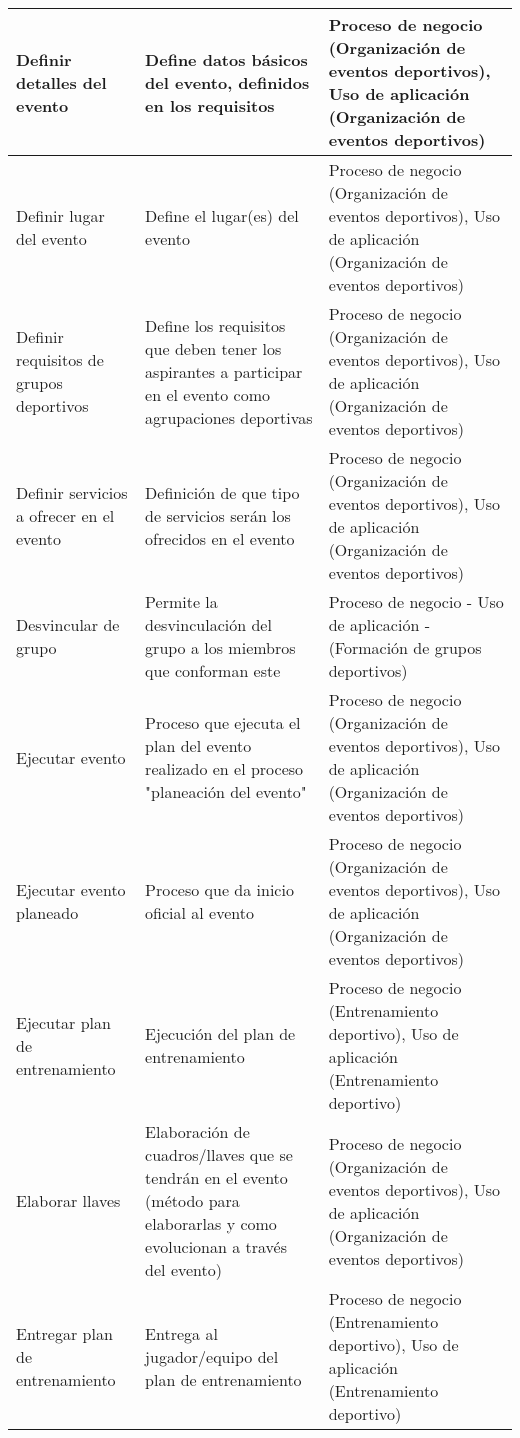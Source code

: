 \begin{center}
\begin{longtable}{|p{4cm}|p{7cm}|p{4cm}|}
		\hline
		Definir detalles del evento & 
		Define datos básicos del evento, definidos en los requisitos  & 
		Proceso de negocio (Organización de eventos deportivos), Uso de aplicación (Organización de eventos deportivos)
		\\
		\hline
		Definir lugar del evento & 
		Define el lugar(es) del evento & 
		Proceso de negocio (Organización de eventos deportivos), Uso de aplicación (Organización de eventos deportivos)
		\\
		\hline
		Definir requisitos de grupos deportivos & 
		Define los requisitos que deben tener los aspirantes a participar en el evento como agrupaciones deportivas & 
		Proceso de negocio (Organización de eventos deportivos), Uso de aplicación (Organización de eventos deportivos)
		\\
		\hline
		Definir servicios a ofrecer en el evento & 
		Definición de que tipo de servicios serán los ofrecidos en el evento & 
		Proceso de negocio (Organización de eventos deportivos), Uso de aplicación (Organización de eventos deportivos)
		\\
		\hline
		Desvincular de grupo & 
		Permite la desvinculación del grupo a los miembros que conforman este & 
		Proceso de negocio - Uso de aplicación - (Formación de grupos deportivos)
		\\
		\hline
		Ejecutar evento & 
		Proceso que ejecuta el plan del evento realizado en el proceso "planeación del evento" & 
		Proceso de negocio (Organización de eventos deportivos), Uso de aplicación (Organización de eventos deportivos)
		\\
		\hline
		Ejecutar evento planeado & 
		Proceso que da inicio oficial al evento & 
		Proceso de negocio (Organización de eventos deportivos), Uso de aplicación (Organización de eventos deportivos)
		\\
		\hline
		Ejecutar plan de entrenamiento & 
		Ejecución del plan de entrenamiento & 
		Proceso de negocio (Entrenamiento deportivo), Uso de aplicación (Entrenamiento deportivo)
		\\
		\hline
		Elaborar llaves & 
		Elaboración de cuadros/llaves que se tendrán en el evento (método para elaborarlas y como evolucionan a través del evento) & 
		Proceso de negocio (Organización de eventos deportivos), Uso de aplicación (Organización de eventos deportivos)
		\\
		\hline
		Entregar plan de entrenamiento & 
		Entrega al jugador/equipo del plan de entrenamiento & 
		Proceso de negocio (Entrenamiento deportivo), Uso de aplicación (Entrenamiento deportivo)

\end{longtable}
\end{center}
